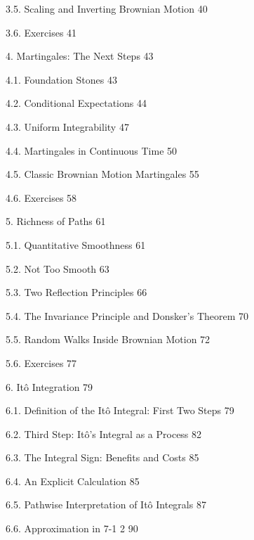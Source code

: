 3.5. Scaling and Inverting Brownian Motion 40



3.6. Exercises 41



4. Martingales: The Next Steps 43



4.1. Foundation Stones 43



4.2. Conditional Expectations 44



4.3. Uniform Integrability 47



4.4. Martingales in Continuous Time 50



4.5. Classic Brownian Motion Martingales 55



4.6. Exercises 58



5. Richness of Paths 61



5.1. Quantitative Smoothness 61



5.2. Not Too Smooth 63



5.3. Two Reflection Principles 66



5.4. The Invariance Principle and Donsker's Theorem 70



5.5. Random Walks Inside Brownian Motion 72



5.6. Exercises 77



6. Itô Integration 79



6.1. Definition of the Itô Integral: First Two Steps 79



6.2. Third Step: Itô's Integral as a Process 82



6.3. The Integral Sign: Benefits and Costs 85



6.4. An Explicit Calculation 85



6.5. Pathwise Interpretation of Itô Integrals 87



6.6. Approximation in 7-1 2 90



